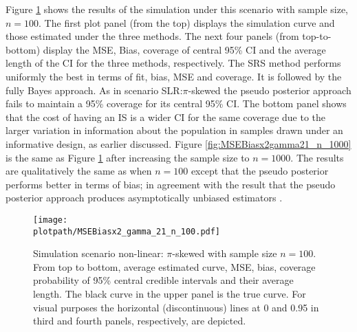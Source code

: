 \documentclass[]{imsart}
\newcommand\plotpath[1] {./#1}
\begin{document}
Figure \ref{fig:MSEBiasx2_gamma_21_n_100} shows the results of the simulation under this scenario with sample size,
$n=100$.
The first plot panel (from the top) displays the simulation curve and those
estimated under the three methods. The next four panels (from top-to-bottom) display the MSE, Bias, coverage of central 95\% CI and the average length of the CI for the three methods, respectively. The SRS method performs uniformly the best in terms of fit, bias, MSE and coverage. It is followed by the fully Bayes approach. As in scenario SLR:$\pi$-skewed the pseudo posterior approach fails to maintain a 95\% coverage for
its central 95\% CI. The bottom panel shows that the cost of having an IS is a wider CI for the same coverage due to the larger variation in information about the population in samples drawn under an informative design, as earlier discussed.
Figure
\ref{fig:MSEBiasx2gamma21_n_1000} is the same as Figure
\ref{fig:MSEBiasx2_gamma_21_n_100} after increasing the sample size to $n=1000$.
The results
are qualitatively the same as when $n=100$
except that the pseudo posterior performs better in terms of bias; in agreement with
the result that the pseudo posterior approach produces asymptotically
unbiased estimators \citep{savitsky2016bayesian}.

\begin{figure}
\begin{center}
\texttt{[image: \\plotpath/MSEBiasx2\_gamma\_21\_n\_100.pdf]} \\
\end{center}
\vskip-5mm
\caption{\label{fig:MSEBiasx2_gamma_21_n_100}
Simulation scenario non-linear: $\pi$-skewed with sample size $n=100$. From top to bottom,
average estimated curve, MSE, bias, coverage probability of 95\% central credible intervals and their average length.
The black curve in the upper panel is the true curve.  For visual purposes the horizontal (discontinuous)
lines at 0 and 0.95 in third and fourth panels, respectively, are depicted.
}
\end{figure}
\end{document}
